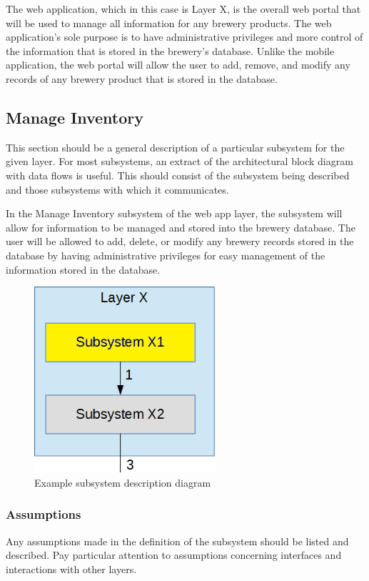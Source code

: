 The web application, which in this case is Layer X, is the overall web portal that will be used to manage all information for any brewery products.  The web application's sole purpose is to have administrative privileges and more control of the information that is stored in the brewery's database.  Unlike the mobile application, the web portal will allow the user to add, remove, and modify any records of any brewery product that is stored in the database.

\subsection{Manage Inventory}
This section should be a general description of a particular subsystem for the given layer. For most subsystems, an extract of the architectural block diagram with data flows is useful. This should consist of the subsystem being described and those subsystems with which it communicates.

In the Manage Inventory subsystem of the web app layer, the subsystem will allow for information to be managed and stored into the brewery database.  The user will be allowed to add, delete, or modify any brewery records stored in the database by having administrative privileges for easy management of the information stored in the database.

\begin{figure}[h!]
	\centering
 	\includegraphics[width=0.60\textwidth]{images/subsystem}
 \caption{Example subsystem description diagram}
\end{figure}

\subsubsection{Assumptions}
Any assumptions made in the definition of the subsystem should be listed and described. Pay particular attention to assumptions concerning interfaces and interactions with other layers.



